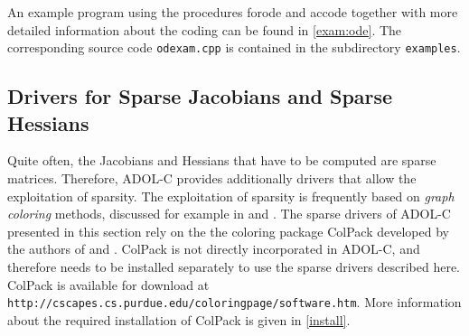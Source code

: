 \documentclass[11pt,twoside]{article}
\begin{document}
An example program using the procedures {\sf forode} and {\sf accode} together
with more detailed information about the coding can be found in
\autoref{exam:ode}. The corresponding source code 
\verb=odexam.cpp= is contained in the subdirectory
\verb=examples=.
%
%
\subsection{Drivers for Sparse Jacobians and Sparse Hessians}
\label{sparse}
%
Quite often, the Jacobians and Hessians that have to be computed are sparse
matrices. Therefore, ADOL-C provides additionally drivers that 
allow the exploitation of sparsity. The exploitation of sparsity is
frequently based on {\em graph coloring} methods, discussed 
for example in \cite{GeMaPo05} and \cite{GeTaMaPo07}. The sparse drivers of ADOL-C presented in this section
rely on the the coloring package ColPack developed by the authors of \cite{GeMaPo05} and \cite{GeTaMaPo07}.
ColPack is not directly incorporated in ADOL-C, and therefore needs to be installed
separately to use the sparse drivers described here. ColPack is available for download at
\verb=http://cscapes.cs.purdue.edu/coloringpage/software.htm=. More information about the required
installation of ColPack is given in \autoref{install}.
%
\end{document}
